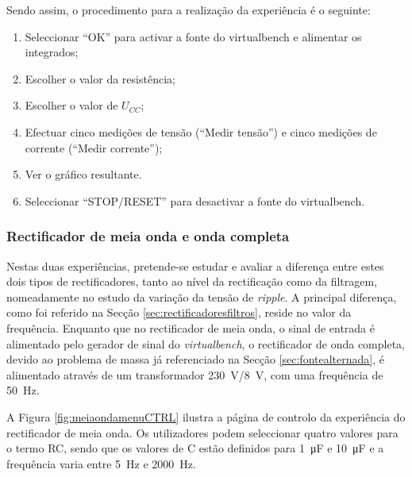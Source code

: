 Sendo assim, o procedimento para a realização da experiência é o seguinte:
\begin{enumerate}
	\item Seleccionar ``OK'' para activar a fonte do \acrshort{virtualbench} e alimentar os integrados;
	\item Escolher o valor da resistência;
	\item Escolher o valor de $U_{CC}$;
	\item Efectuar cinco medições de tensão (``Medir tensão'') e cinco medições de corrente (``Medir corrente'');
	\item Ver o gráfico resultante.
	\item Seleccionar ``STOP/RESET'' para desactivar a fonte do \acrshort{virtualbench}.
\end{enumerate}

\subsubsection{Rectificador de meia onda e onda completa}
\label{sec:rectificadores}
Nestas duas experiências, pretende-se estudar e avaliar a diferença entre estes dois tipos de rectificadores, tanto ao nível da rectificação como da filtragem, nomeadamente no estudo da variação da tensão de \textit{ripple}. A principal diferença, como foi referido na Secção \ref{sec:rectificadoresfiltros}, reside no valor da frequência. Enquanto que no rectificador de meia onda, o sinal de entrada é alimentado pelo gerador de sinal do \textit{virtualbench}, o rectificador de onda completa, devido ao problema de massa já referenciado na Secção \ref{sec:fontealternada}, é alimentado através de um transformador \SI{230}{\volt}/\SI{8}{\volt}, com uma frequência de \SI{50}{\hertz}.

A Figura \ref{fig:meiaondamenuCTRL} ilustra a página de controlo da experiência do rectificador de meia onda. Os utilizadores podem seleccionar quatro valores para o termo RC, sendo que os valores de C estão definidos para \SI{1}{\micro\farad} e \SI{10}{\micro\farad} e a frequência varia entre \SI{5}{\hertz} e \SI{2000}{\hertz}. 

